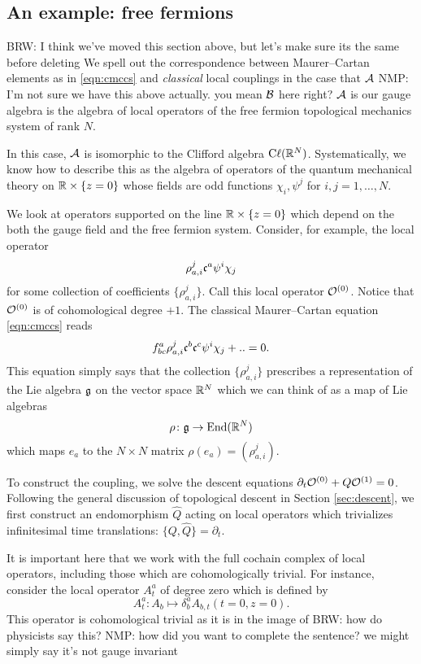 \documentclass[11pt]{amsart}
\def\brian#1{{\textcolor{blue!65!red}{BRW: {#1}}}}
\def\natalie#1{{\textcolor{green!65!black}{NMP: {#1}}}}
\begin{document}
\subsection*{An example: free fermions}
\brian{I think we've moved this section above, but let's make sure its the same before deleting}
We spell out the correspondence between Maurer--Cartan elements as in \eqref{eqn:cmccs} and {\em classical} local couplings in the case that $\mathcal A$ \natalie{I'm not sure we have this above actually. you mean $\mathcal B$ here right? $\mathcal A$ is our gauge algebra} is the algebra of local operators of the free fermion topological mechanics system of rank $N$. 

In this case, $\mathcal A$ is isomorphic to the Clifford algebra ${\rm C}\ell(\mathbb R^N)$. 
Systematically, we know how to describe this as the algebra of operators of the quantum mechanical theory on $\mathbb R \times \{z=0\}$ whose fields are odd functions $\chi_i, \psi^j$ for $i,j=1,\ldots, N$. 

We look at operators supported on the line $\mathbb R \times \{z=0\}$ which depend on the both the gauge field and the free fermion system.
Consider, for example, the local operator
\[
\rho_{a,i}^{j} \mathfrak c^a \psi^i \chi_j 
\]
for some collection of coefficients $\{\rho_{a,i}^{j}\}$. 
Call this local operator $\mathcal O^{(0)}$. 
Notice that $\mathcal O^{(0)}$ is of cohomological degree $+1$.
The classical Maurer--Cartan equation \eqref{eqn:cmccs} reads
\[
f_{bc}^a \rho_{a,i}^{j}  \mathfrak c^b \mathfrak c^c \psi^i \chi_j + .. = 0. 
\]
This equation simply says that the collection $\{\rho_{a,i}^{j} \}$ prescribes a representation of the Lie algebra $\mathfrak g$ on the vector space $\mathbb R^N$ which we can think of as a map of Lie algebras 
\[
\rho \colon \mathfrak g \to {\rm End}(\mathbb R^N)
\]
which maps $e_a$ to the $N \times N$ matrix $\rho(e_a) = (\rho_{a,i}^{j})$. 

To construct the coupling, we solve the descent equations $\partial_t \mathcal O^{(0)} + Q \mathcal O^{(1)} = 0$.
Following the general discussion of topological descent in Section \ref{sec:descent}, we first construct an endomorphism $\hat{Q}$ acting on local operators which trivializes infinitesimal time translations: $\{Q, \hat{Q}\} = \partial_t$. 

It is important here that we work with the full cochain complex of local operators, including those which are cohomologically trivial. 
For instance, consider the local operator $A^a_t$ of degree zero which is defined by
\[
A^a_{t} \colon A_b \mapsto \delta^a_b A_{b,t} (t=0, z=0) .
\]
This operator is cohomological trivial as it is in the image of \brian{how do physicists say this?} \natalie{how did you want to complete the sentence? we might simply say it's not gauge invariant}
\end{document}
